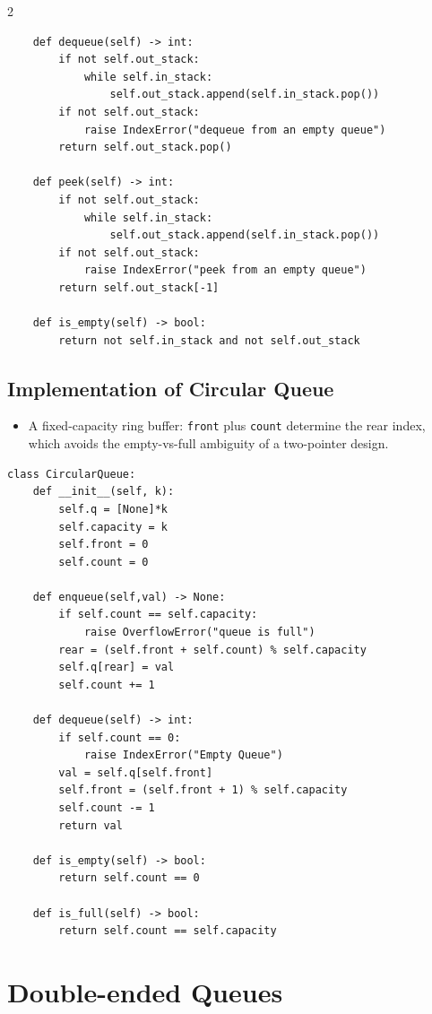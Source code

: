 \documentclass[9pt,a4paper]{extarticle}
\newlength{\tw}
\begin{document}
\begin{multicols}{2}
\begin{lstlisting}
    def dequeue(self) -> int:
        if not self.out_stack:
            while self.in_stack:
                self.out_stack.append(self.in_stack.pop())
        if not self.out_stack:
            raise IndexError("dequeue from an empty queue")
        return self.out_stack.pop()

    def peek(self) -> int:
        if not self.out_stack:
            while self.in_stack:
                self.out_stack.append(self.in_stack.pop())
        if not self.out_stack:
            raise IndexError("peek from an empty queue")
        return self.out_stack[-1]

    def is_empty(self) -> bool:
        return not self.in_stack and not self.out_stack
\end{lstlisting}

\subsection{Implementation of Circular Queue}

\begin{itemize}
\item A fixed-capacity ring buffer: \texttt{front} plus \texttt{count} determine the rear index, which avoids the empty-vs-full ambiguity of a two-pointer design.
\end{itemize}

\begin{lstlisting}
class CircularQueue:
    def __init__(self, k):
        self.q = [None]*k
        self.capacity = k
        self.front = 0
        self.count = 0

    def enqueue(self,val) -> None:
        if self.count == self.capacity:
            raise OverflowError("queue is full")
        rear = (self.front + self.count) % self.capacity
        self.q[rear] = val
        self.count += 1

    def dequeue(self) -> int:
        if self.count == 0:
            raise IndexError("Empty Queue")
        val = self.q[self.front]
        self.front = (self.front + 1) % self.capacity
        self.count -= 1
        return val

    def is_empty(self) -> bool:
        return self.count == 0

    def is_full(self) -> bool:
        return self.count == self.capacity
\end{lstlisting}

\section{Double-ended Queues}


\end{multicols}
\end{document}
